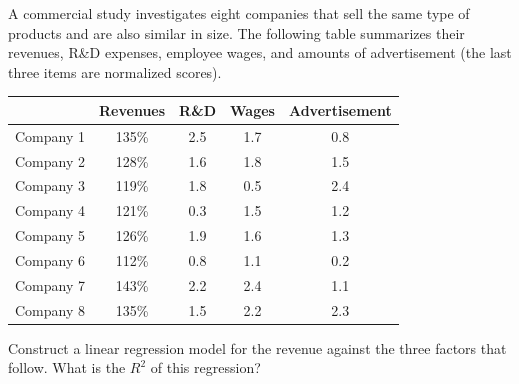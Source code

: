 \begin{Exercise}
A commercial study investigates eight companies that sell the same type of products and are also similar in size. The following table summarizes their revenues, R\&D expenses, employee wages, and amounts of advertisement (the last three items are normalized scores).
\begin{center}
\begin{tabular}{|c|c|c|c|c|}
\hline
& Revenues & R\&D & Wages & Advertisement \\
\hline
Company 1 & 135\% & 2.5 & 1.7 & 0.8 \\
\hline
Company 2 & 128\% & 1.6 & 1.8 & 1.5 \\
\hline
Company 3 & 119\% & 1.8 & 0.5 & 2.4 \\
\hline
Company 4 & 121\% & 0.3 & 1.5 & 1.2 \\
\hline
Company 5 & 126\% & 1.9 & 1.6 & 1.3 \\
\hline
Company 6 & 112\% & 0.8 & 1.1 & 0.2 \\
\hline
Company 7 & 143\% & 2.2 & 2.4 & 1.1 \\
\hline
Company 8 & 135\% & 1.5 & 2.2 & 2.3 \\
\hline
\end{tabular}
\end{center}
Construct a linear regression model for the revenue against the three factors that follow. What is the $R^2$ of this regression?
\end{Exercise} 